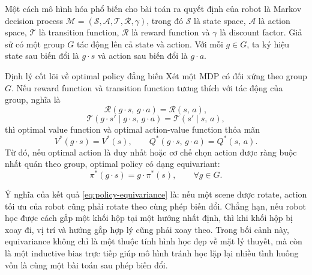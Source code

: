 
Một cách mô hình hóa phổ biến cho bài toán ra quyết định của robot là Markov decision process $\mathcal{M}=(\mathcal{S},\mathcal{A},\mathcal{T},\mathcal{R},\gamma)$, trong đó $\mathcal{S}$ là state space, $\mathcal{A}$ là action space, $\mathcal{T}$ là transition function, $\mathcal{R}$ là reward function và $\gamma$ là discount factor. Giả sử có một group $G$ tác động lên cả state và action. Với mỗi $g \in G$, ta ký hiệu state sau biến đổi là $g \cdot s$ và action sau biến đổi là $g \cdot a$.

\begin{InfoBox}{Định lý cốt lõi về optimal policy đẳng biến}
Xét một MDP có đối xứng theo group $G$. Nếu reward function và transition function tương thích với tác động của group, nghĩa là
\begin{equation}
    \mathcal{R}(g \cdot s,\, g \cdot a) = \mathcal{R}(s,\,a),
    \label{eq:reward-equivariance}
\end{equation}
\begin{equation}
    \mathcal{T}(g \cdot s' \mid g \cdot s,\, g \cdot a)
    =
    \mathcal{T}(s' \mid s,\,a),
    \label{eq:transition-equivariance}
\end{equation}
thì optimal value function và optimal action-value function thỏa mãn
\begin{equation}
    V^*(g \cdot s) = V^*(s),
    \qquad
    Q^*(g \cdot s,\, g \cdot a) = Q^*(s,\,a).
    \label{eq:value-invariance}
\end{equation}
Từ đó, nếu optimal action là duy nhất hoặc cơ chế chọn action được ràng buộc nhất quán theo group, optimal policy có dạng equivariant:
\begin{equation}
    \pi^*(g \cdot s) = g \cdot \pi^*(s),
    \qquad \forall g \in G.
    \label{eq:policy-equivariance}
\end{equation}
\end{InfoBox}

Ý nghĩa của kết quả \eqref{eq:policy-equivariance} là: nếu một scene được rotate, action tối ưu của robot cũng phải rotate theo cùng phép biến đổi. Chẳng hạn, nếu robot học được cách gắp một khối hộp tại một hướng nhất định, thì khi khối hộp bị xoay đi, vị trí và hướng gắp hợp lý cũng phải xoay theo. Trong bối cảnh này, equivariance không chỉ là một thuộc tính hình học đẹp về mặt lý thuyết, mà còn là một inductive bias trực tiếp giúp mô hình tránh học lặp lại nhiều tình huống vốn là cùng một bài toán sau phép biến đổi.

